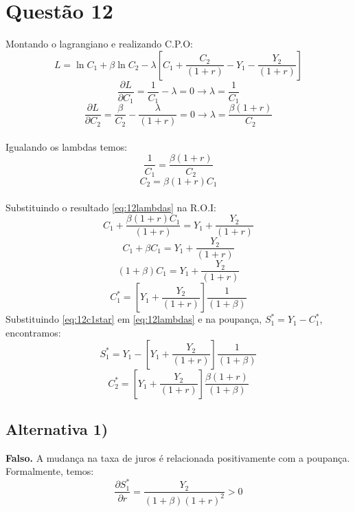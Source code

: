\documentclass{article}
\begin{document}
\section*{Questão 12}
Montando o lagrangiano e realizando C.P.O:
\begin{equation}
    L = \ln C_1 + \beta\ln C_2 - \lambda\left[C_1+\frac{C_2}{(1+r)}-Y_1-\frac{Y_2}{(1+r)}\right]
\end{equation}
\begin{equation}
    \frac{\partial L}{\partial C_1}=\frac{1}{C_1}-\lambda=0 \to \lambda=\frac{1}{C_1}
\end{equation}
\begin{equation}
    \frac{\partial L}{\partial C_2}=\frac{\beta}{C_2}-\frac{\lambda}{(1+r)}=0 \to \lambda=\frac{\beta(1+r)}{C_2}
\end{equation}
\\
Igualando os lambdas temos:
\begin{equation}
    \frac{1}{C_1}=\frac{\beta(1+r)}{C_2}
\end{equation}
\begin{equation}\label{eq:12lambdas}
    C_2=\beta(1+r)C_1
\end{equation}
\\
Substituindo o resultado \eqref{eq:12lambdas} na R.O.I:
\begin{equation}
    C_1+\frac{\beta(1+r)C_1}{(1+r)}=Y_1+\frac{Y_2}{(1+r)}
\end{equation}
\begin{equation}
    C_1+\beta C_1=Y_1+\frac{Y_2}{(1+r)}
\end{equation}
\begin{equation}
    (1+\beta)C_1=Y_1+\frac{Y_2}{(1+r)}
\end{equation}
\begin{equation}\label{eq:12c1star}
    C_1^*=\left[Y_1+\frac{Y_2}{(1+r)}\right]\frac{1}{(1+\beta)}
\end{equation}
Substituindo \eqref{eq:12c1star} em \eqref{eq:12lambdas} e na poupança, $S_1^*=Y_1-C_1^*$, encontramos:
\begin{equation}
    S_1^*=Y_1-\left[Y_1+\frac{Y_2}{(1+r)}\right]\frac{1}{(1+\beta)}
\end{equation}
\begin{equation}
    C_2^*=\left[Y_1+\frac{Y_2}{(1+r)}\right]\frac{\beta(1+r)}{(1+\beta)}
\end{equation}
\clearpage
\subsection*{Alternativa 1)}
\textbf{Falso.} A mudança na taxa de juros é relacionada positivamente com a poupança. Formalmente, temos:
\begin{equation}
    \frac{\partial S_1^*}{\partial r} = \frac{Y_2}{(1+\beta)(1+r)^2} > 0
\end{equation}
\end{document}
